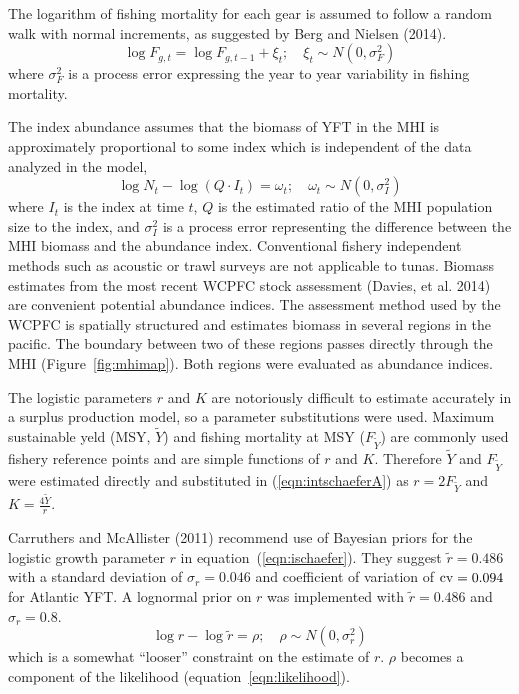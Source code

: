 \documentclass[12pt,letterpaper]{article}
\newcommand\MSY{\widetilde{Y}}
\newcommand\Fmsy{F_{\MSY}}
\begin{document}
The logarithm of fishing mortality for each gear is assumed to
follow a random walk with normal increments, as suggested by Berg and
Nielsen (2014).
\begin{equation}
\label{eqn:Fwalk}
\log F_{g,t} = \log F_{g,t-1} + \xi_t;\quad \xi_t\sim
N(0,\sigma^2_F)
\end{equation}
where  $\sigma^2_F$ is a process error expressing the year to year
variability in fishing mortality.

The index abundance assumes that the biomass of YFT in the MHI
is approximately proportional to some index which is independent of
the data analyzed in the model,
\begin{equation}
\log N_t - \log (Q\cdot I_t) = \omega_t;\quad \omega_t\sim N(0,\sigma^2_I)
\label{eqn:index}
\end{equation}
where
$I_t$ is the index at time $t$,
$Q$ is the estimated ratio of the MHI population size to the index,
and $\sigma^2_I$ is a process error representing the difference
between the MHI biomass and the abundance index. 
Conventional fishery independent methods such as acoustic or trawl
surveys are not applicable to tunas. 
Biomass estimates from the most recent WCPFC stock
assessment (Davies, et al. 2014) are convenient potential abundance
indices. The assessment method used by the
WCPFC is spatially structured and estimates biomass in several regions
in the pacific. The boundary between two of these
regions passes directly through the MHI (Figure~\ref{fig:mhimap}).
Both regions were evaluated as abundance indices.

The logistic parameters $r$ and $K$ are notoriously difficult to estimate
accurately in a surplus production model, 
so a parameter substitutions were used. 
Maximum sustainable yeld
(MSY, $\MSY$) and fishing mortality at MSY ($\Fmsy$) are commonly used
fishery reference points and are simple functions of $r$ and $K$.
Therefore $\MSY$ and $\Fmsy$ were
estimated directly and substituted in (\ref{eqn:intschaeferA}) as
$r=2\Fmsy$ and $K=\frac{4\MSY}{r}$.

Carruthers and McAllister (2011) recommend use of Bayesian priors for the
logistic growth parameter $r$ in equation~(\ref{eqn:ischaefer}). They
suggest $\tilde{r} = 0.486$ with a standard deviation of $\sigma_r = 0.046$
and coefficient of variation of ${\rm cv}=0.094$ for Atlantic YFT.
A lognormal prior on $r$ was implemented with 
$\tilde{r} = 0.486$ and $\sigma_r = 0.8$.
\begin{equation}
\log r - \log \tilde{r} = \rho ;\quad \rho\sim N(0,\sigma^2_r)
\end{equation}
which is a somewhat ``looser'' constraint on the estimate of $r$.
$\rho$ becomes a component of the likelihood
(equation~\ref{eqn:likelihood}).
\end{document}
